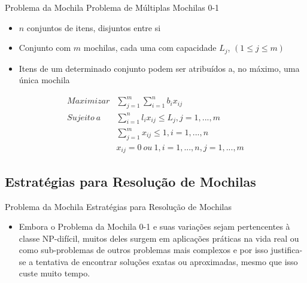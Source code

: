 \documentclass[slidestop,compress,mathserif]{beamer}
\begin{document}





\begin{frame} {Problema da Mochila} {Problema de Múltiplas Mochilas 0-1}

\scriptsize
\begin{itemize}
 \item $n$ conjuntos de itens, disjuntos entre si
 \item Conjunto com $m$ mochilas, cada uma com capacidade $L_j$, $(1 \leq j \leq m)$
 \item Itens de um determinado conjunto podem ser atribuídos a, no máximo, uma única mochila 
 
\end{itemize}

\begin{eqnarray}
	Maximizar & \displaystyle \sum_{j=1}^m \sum_{i=1}^n b_i x_{ij} \\
	Sujeito \ a & \displaystyle \sum_{i=1}^n l_i x_{ij} \leq L_j, j=1,...,m \\
	& \displaystyle \sum_{j=1}^m x_{ij} \leq 1, i=1,...,n \\
	& x_{ij}=0 \ ou \ 1, i=1,...,n , j=1,...,m \nonumber
\end{eqnarray} 

\end{frame}


\subsection{Estratégias para Resolução de Mochilas}
\begin{frame} {Problema da Mochila} {Estratégias para Resolução de Mochilas}

\begin{itemize}
\item Embora o Problema da Mochila 0-1 e suas variações sejam pertencentes à classe NP-difícil, muitos deles surgem em aplicações práticas na vida real ou como sub-problemas de outros problemas mais complexos e por isso justifica-se a tentativa de encontrar soluções exatas ou aproximadas, mesmo que isso custe muito tempo.
\end{itemize}

\end{frame}
\end{document}
